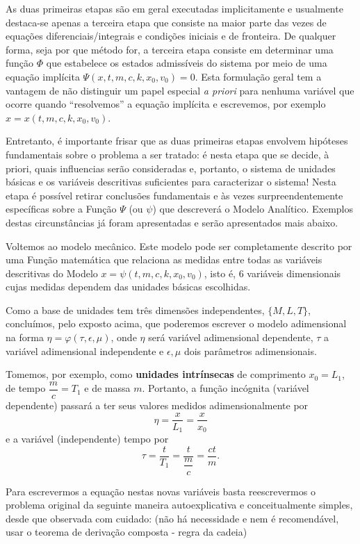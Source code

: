     As duas primeiras etapas são em geral executadas implicitamente e usualmente destaca-se apenas a terceira etapa que consiste na maior parte das vezes de equações diferenciais/integrais e condições iniciais e de fronteira. De qualquer forma, seja por que método for, a terceira etapa consiste em determinar uma função \(\Phi\) que estabelece os estados admissíveis do sistema por meio de uma equação implícita \(\Psi(x, t, m, c, k, x_0, v_0) = 0\). Esta formulação geral tem a vantagem de não distinguir um papel especial \textit{a priori} para nenhuma variável que ocorre quando ``resolvemos'' a equação implícita e escrevemos, por exemplo \(x = x(t, m, c, k, x_0, v_0)\).

    Entretanto, é importante frisar que as duas primeiras etapas envolvem hipóteses fundamentais sobre o problema a ser tratado: é nesta etapa que se decide, à priori, quais influencias serão consideradas e, portanto, o sistema de unidades básicas e os variáveis descritivas suficientes para caracterizar o sistema! Nesta etapa é possível retirar conclusões fundamentais e às vezes surpreendentemente específicas sobre a Função \(\Psi\) (ou \(\psi\)) que descreverá o Modelo Analítico. Exemplos destas circunstâncias já foram apresentadas e serão apresentados mais abaixo.

    Voltemos ao modelo mecânico. Este modelo pode ser completamente descrito por uma Função matemática que relaciona as medidas entre todas as variáveis descritivas do Modelo \(x = \psi(t, m, c, k, x_0, v_0)\), isto é, \(6\) variáveis dimensionais cujas medidas dependem das unidades básicas escolhidas.

    Como a base de unidades tem três dimensões independentes, \(\{M, L, T\}\), concluímos, pelo exposto acima, que poderemos escrever o modelo adimensional na forma \(\eta = \varphi(\tau, \epsilon, \mu)\), onde \(\eta\) será variável adimensional dependente, \(\tau\) a variável adimensional independente e \(\epsilon, \mu\) dois parâmetros adimensionais.

    Tomemos, por exemplo, como \textbf{unidades intrínsecas} de comprimento \(x_0 = L_{1}\), de tempo \(\dfrac{m}{c} = T_{1}\) e de massa \(m\). Portanto, a função incógnita (variável dependente) passará a ter seus valores medidos adimensionalmente por
    \[\eta = \dfrac{x}{L_{1}} = \dfrac{x}{x_0}\]
    e a variável (independente) tempo por
    \[\tau = \dfrac{t}{T_{1}} = \dfrac{t}{\dfrac{m}{c}} = \dfrac{ct}{m}.\]
    
    Para escrevermos a equação nestas novas variáveis basta reescrevermos o problema original da seguinte maneira autoexplicativa e conceitualmente simples, desde que observada com cuidado: (não há necessidade e nem é recomendável, usar o teorema de derivação composta - regra da cadeia)
    
